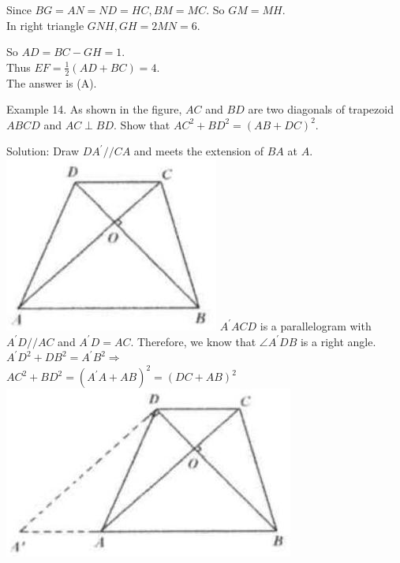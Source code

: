 \documentclass[10pt]{article}
\begin{document}
Since \(B G=A N=N D=H C, B M=M C\). So \(G M=M H\).\\
In right triangle \(G N H, G H=2 M N=6\).


So \(A D=B C-G H=1\).\\
Thus \(E F=\frac{1}{2}(A D+B C)=4\).\\
The answer is (A).

Example 14. As shown in the figure, \(A C\) and \(B D\) are two diagonals of trapezoid \(A B C D\) and \(A C \perp B D\). Show that \(A C^{2}+B D^{2}=(A B+D C)^{2}\).

Solution:
Draw \(D A^{\prime} / / C A\) and meets the extension of \(B A\) at \(A\).\\
\includegraphics[max width=\textwidth]{2025_04_17_97bc1f7e44d93c271a88g-117} \(A^{\prime} A C D\) is a parallelogram with \(A^{\prime} D / / A C\) and \(A^{\prime} D=A C\). Therefore, we know that \(\angle A^{\prime} D B\) is a right angle.\\
\(A^{\prime} D^{2}+D B^{2}=A^{\prime} B^{2} \Rightarrow\)\\
\(A C^{2}+B D^{2}=\left(A^{\prime} A+A B\right)^{2}=(D C+A B)^{2}\)\\
\includegraphics[max width=\textwidth, center]{2025_04_17_97bc1f7e44d93c271a88g-117(3)}
\end{document}
